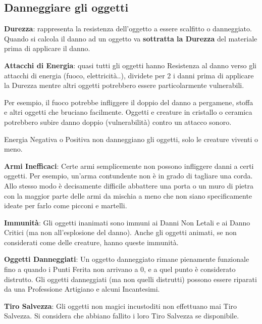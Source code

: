 \begin{multicols}{2}

\subsection{Danneggiare gli oggetti}

\textbf{Durezza}: rappresenta la resistenza dell'oggetto a essere scalfitto o danneggiato. Quando si calcola il danno ad un oggetto va \textbf{sottratta la Durezza} del materiale prima di applicare il danno.

\textbf{Attacchi di Energia}: quasi tutti gli oggetti hanno Resistenza al danno verso gli attacchi di energia (fuoco, elettricità..), dividete per 2 i danni prima di applicare la Durezza mentre altri oggetti potrebbero essere particolarmente vulnerabili.

Per esempio, il fuoco potrebbe infliggere il doppio del danno a pergamene, stoffa e altri oggetti che bruciano facilmente. Oggetti e creature in cristallo o ceramica potrebbero subire danno doppio (vulnerabilità) contro un attacco sonoro.

Energia Negativa o Positiva non danneggiano gli oggetti, solo le creature viventi o meno.

\textbf{Armi Inefficaci}: Certe armi semplicemente non possono infliggere danni a certi oggetti. Per esempio, un'arma contundente non è in grado di tagliare una corda.
Allo stesso modo è decisamente difficile abbattere una porta o un muro di pietra con la maggior parte delle armi da mischia a meno che non siano specificamente ideate per farlo come picconi e martelli.

\textbf{Immunità}: Gli oggetti inanimati sono immuni ai Danni Non Letali e ai Danno Critici (ma non all'esplosione del danno). Anche gli oggetti animati, se non considerati come delle creature, hanno queste immunità.

\textbf{Oggetti Danneggiati}: Un oggetto danneggiato rimane pienamente funzionale fino a quando i Punti Ferita non arrivano a 0, e a quel punto è considerato distrutto. Gli oggetti danneggiati (ma non quelli distrutti) possono essere riparati da una Professione Artigiano e alcuni Incantesimi.

\textbf{Tiro Salvezza}: Gli oggetti non magici incustoditi non effettuano mai Tiro Salvezza. Si considera che abbiano fallito i loro Tiro Salvezza se disponibile.


\end{multicols}
